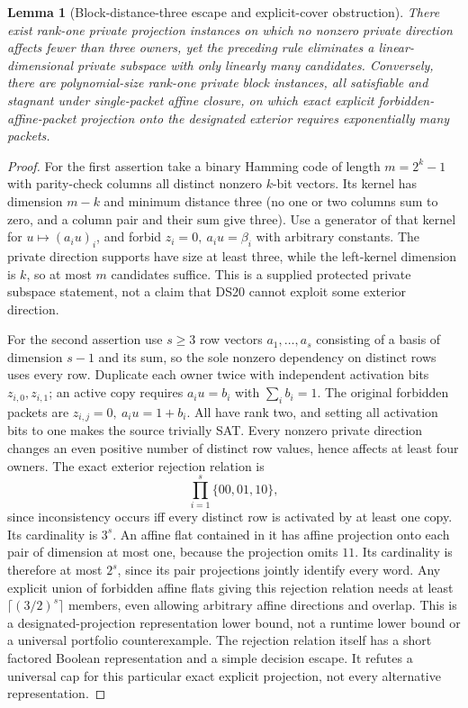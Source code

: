 \documentclass[11pt]{article}
\newtheorem{lemma}[theorem]{Lemma}
\begin{document}
\begin{lemma}[Block-distance-three escape and explicit-cover obstruction]\label{lem:s26-barrier}
There exist rank-one private projection instances on which no nonzero private direction affects fewer than three owners, yet the preceding rule eliminates a linear-dimensional private subspace with only linearly many candidates. Conversely, there are polynomial-size rank-one private block instances, all satisfiable and stagnant under single-packet affine closure, on which exact explicit forbidden-affine-packet projection onto the designated exterior requires exponentially many packets.
\end{lemma}
\begin{proof}
For the first assertion take a binary Hamming code of length $m=2^k-1$ with parity-check columns all distinct nonzero $k$-bit vectors. Its kernel has dimension $m-k$ and minimum distance three (no one or two columns sum to zero, and a column pair and their sum give three). Use a generator of that kernel for $u\mapsto(a_i u)_i$, and forbid $z_i=0,\ a_i u=\beta_i$ with arbitrary constants. The private direction supports have size at least three, while the left-kernel dimension is $k$, so at most $m$ candidates suffice. This is a supplied protected private subspace statement, not a claim that DS20 cannot exploit some exterior direction.

For the second assertion use $s\ge3$ row vectors $a_1,\dots,a_s$ consisting of a basis of dimension $s-1$ and its sum, so the sole nonzero dependency on distinct rows uses every row. Duplicate each owner twice with independent activation bits $z_{i,0},z_{i,1}$; an active copy requires $a_i u=b_i$ with $\sum_i b_i=1$. The original forbidden packets are $z_{i,j}=0,\ a_i u=1+b_i$. All have rank two, and setting all activation bits to one makes the source trivially SAT. Every nonzero private direction changes an even positive number of distinct row values, hence affects at least four owners. The exact exterior rejection relation is
\[
 \prod_{i=1}^s\{00,01,10\},
\]
since inconsistency occurs iff every distinct row is activated by at least one copy. Its cardinality is $3^s$. An affine flat contained in it has affine projection onto each pair of dimension at most one, because the projection omits $11$. Its cardinality is therefore at most $2^s$, since its pair projections jointly identify every word. Any explicit union of forbidden affine flats giving this rejection relation needs at least $\lceil(3/2)^s\rceil$ members, even allowing arbitrary affine directions and overlap. This is a designated-projection representation lower bound, not a runtime lower bound or a universal portfolio counterexample. The rejection relation itself has a short factored Boolean representation and a simple decision escape. It refutes a universal cap for this particular exact explicit projection, not every alternative representation.
\end{proof}
\end{document}
